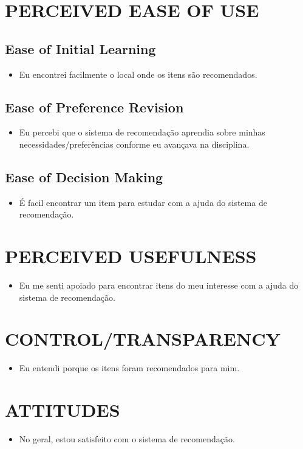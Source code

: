 \section{PERCEIVED EASE OF USE}
\subsection{Ease of Initial Learning}
\begin{itemize}
\item Eu encontrei facilmente o local onde os itens são recomendados.
\end{itemize}
\subsection{Ease of Preference Revision}
\begin{itemize}
\item Eu percebi que o sistema de recomendação aprendia sobre minhas necessidades/preferências conforme eu avançava na disciplina.
\end{itemize}
\subsection{Ease of Decision Making}
\begin{itemize}
\item É facil encontrar um item para estudar com a ajuda do sistema de recomendação.
\end{itemize}
\section{PERCEIVED USEFULNESS}
\begin{itemize}
\item Eu me senti apoiado para encontrar itens do meu interesse com a ajuda do sistema de recomendação.
\end{itemize}
\section{CONTROL/TRANSPARENCY}
\begin{itemize}
\item Eu entendi porque os itens foram recomendados para mim.
\end{itemize}
\section{ATTITUDES}
\begin{itemize}
\item No geral, estou satisfeito com o sistema de recomendação.
\end{itemize}
